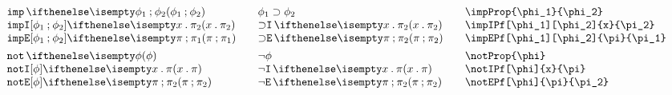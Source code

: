 \documentclass[11pt]{article}
\begin{document}
\begin{small}
\begin{displaymath}
\begin{array}{l@{\qquad}l@{\qquad}l@{\qquad}l}
      \impProp{\phi_1}{\phi_2}                        & \impProp*{\phi_1}{\phi_2}        & \verb|\impProp{\phi_1}{\phi_2}|                        \\
      \impIPf[\phi_1][\phi_2]{x}{\pi_2}               & \impIPf*{x}{\pi_2}               & \verb|\impIPf[\phi_1][\phi_2]{x}{\pi_2}|               \\
      \impEPf[\phi_1][\phi_2]{\pi}{\pi_1}             & \impEPf*{\pi}{\pi_2}             & \verb|\impEPf[\phi_1][\phi_2]{\pi}{\pi_1}|             \\[1ex]

      \notProp{\phi}                                  & \notProp*{\phi}                  & \verb|\notProp{\phi}|                                  \\
      \notIPf[\phi]{x}{\pi}                           & \notIPf*{x}{\pi}                 & \verb|\notIPf[\phi]{x}{\pi}|                           \\
      \notEPf[\phi]{\pi}{\pi_2}                       & \notEPf*{\pi}{\pi_2}             & \verb|\notEPf[\phi]{\pi}{\pi_2}|
    \end{array}
  \end{displaymath}
\end{small}
\end{document}
